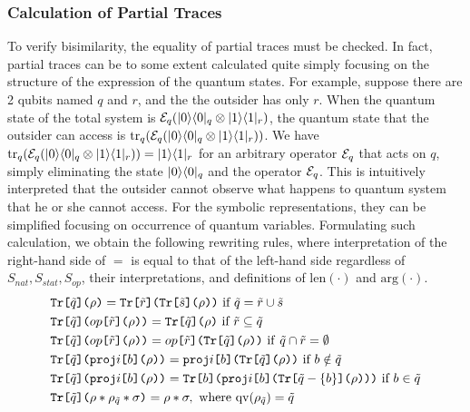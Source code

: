\subsubsection{Calculation of Partial Traces}
\label{symqccs:traceoutalgo}
To verify bisimilarity, the equality of partial traces
must be checked.
In fact, partial traces can be to some extent calculated
quite simply focusing on the structure of the expression of the quantum
states. 
For example,
suppose there are 2 qubits named $q$ and $r$, and the 
the outsider has only $r$. When the quantum state of the total system
is $\mathcal{E}_q(|0\rangle\langle 0|_q\otimes|1\rangle\langle 1|_r)$,
the quantum state that the outsider can access is
${\rm tr}_{q}(\mathcal{E}_q(|0\rangle\langle 0|_q\otimes|1\rangle\langle 1|_r))$.
We have ${\rm tr}_{q}(\mathcal{E}_q(|0\rangle\langle 0|_q\otimes|1\rangle\langle 1|_r)) =
|1\rangle\langle 1|_r$ for an arbitrary operator $\mathcal{E}_q$ that acts on $q$,
simply eliminating the state $|0\rangle\langle 0|_q$ and
the operator $\mathcal{E}_q$.
This is intuitively interpreted that 
the outsider cannot observe what happens to quantum system that
he or she cannot access.
For the symbolic representations, they can be simplified
focusing on occurrence of quantum variables.
Formulating such calculation, we obtain the following rewriting
rules, where interpretation of the right-hand side of $=$ is equal to
that of the left-hand side regardless of $S_{\mathit{nat}},
S_{\mathit{stat}}, S_{\mathit{op}}$, their interpretations, 
and definitions of $\mathrm{len}(\cdot)$ and $\mathrm{arg}(\cdot)$.
\begin{align}
& \mathtt{Tr}\texttt{[}\tilde q\texttt{]}\texttt{(}\rho\texttt{)}=\mathtt{Tr}\texttt{[}\tilde r\texttt{]}\texttt{(}\mathtt{Tr}\texttt{[}\tilde s\texttt{]}\texttt{(}\rho\texttt{)}\texttt{)}
 \mbox{ if } \tilde q = \tilde r \cup \tilde s\\
& \mathtt{Tr}\texttt{[}\tilde q\texttt{]}\texttt{(}op\texttt{[}\tilde
 r\texttt{]}\texttt{(}\rho\texttt{)}\texttt{)} = \mathtt{Tr}\texttt{[}\tilde q\texttt{]}\texttt{(}\rho\texttt{)} \mbox{ if }
 \tilde r \subseteq \tilde q \\
&\mathtt{Tr}\texttt{[}\tilde q\texttt{]}\texttt{(}op\texttt{[}\tilde r\texttt{]}\texttt{(}\rho\texttt{)}\texttt{)}=
 op\texttt{[}\tilde r\texttt{]}\texttt{(}\mathtt{Tr}\texttt{[}\tilde q\texttt{]}\texttt{(}\rho\texttt{)}\texttt{)}~\mathrm{if}~\tilde q \cap
 \tilde r = \emptyset\\
& \mathtt{Tr}\texttt{[}\tilde q\texttt{]}\texttt{(}\mathtt{proj}i\texttt{[}b\texttt{]}\texttt{(}\rho\texttt{)}\texttt{)}=
\mathtt{proj}i\texttt{[}b\texttt{]}\texttt{(}\mathtt{Tr}\texttt{[}\tilde q\texttt{]}\texttt{(}\rho\texttt{)}\texttt{)}
 \mbox{ if } b \notin \tilde q\\
& \mathtt{Tr}\texttt{[}\tilde q\texttt{]}\texttt{(}\mathtt{proj}i\texttt{[}b\texttt{]}\texttt{(}\rho\texttt{)}\texttt{)}=
\mathtt{Tr}\texttt{[}b\texttt{]}\texttt{(}\mathtt{proj}i\texttt{[}b\texttt{]}\texttt{(}\mathtt{Tr}\texttt{[}\tilde q -
 \{b\}\texttt{]}\texttt{(}\rho\texttt{)}\texttt{)}\texttt{)} \mbox{ if } b \in \tilde q\\
&\mathtt{Tr}\texttt{[}\tilde q\texttt{]}\texttt{(}\rho * \rho_{\tilde q} * \sigma\texttt{)} = \rho *
 \sigma, \mbox{ where } \mathrm{qv}(\rho_{\tilde q}) = \tilde q
\end{align}

